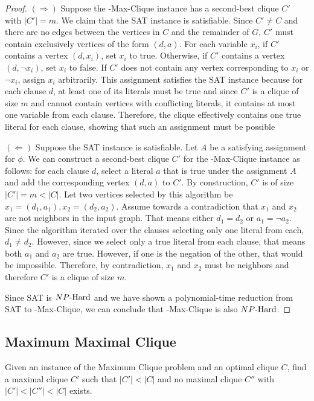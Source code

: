 \begin{proof}
$(\Rightarrow)$ Suppose the \exb{}-Max-Clique instance has a second-best clique $C'$ with $|C'| = m$. We claim that the SAT instance is satisfiable. Since $C' \neq C$ and there are no edges between the vertices in $C$ and the remainder of $G$, $C'$ must contain exclusively vertices of the form $(d, a)$. For each variable $x_i$, if $C'$ contains a vertex $(d, x_i)$, set $x_i$ to true. Otherwise, if $C'$ contains a vertex $(d, \neg x_i)$, set $x_i$ to false. If $C'$ does not contain any vertex corresponding to $x_i$ or $\neg x_i$, assign $x_i$ arbitrarily. This assignment satisfies the SAT instance because for each clause $d$, at least one of its literals must be true and since $C'$ is a clique of size $m$ and cannot contain vertices with conflicting literals, it contains at most one variable from each clause. Therefore, the clique effectively contains one true literal for each clause, showing that such an assignment must be possible

$(\Leftarrow)$ Suppose the SAT instance is satisfiable. Let $A$ be a satisfying assignment for $\phi$. We can construct a second-best clique $C'$ for the \exb{}-Max-Clique instance as follows: for each clause $d$, select a literal $a$ that is true under the assignment $A$ and add the corresponding vertex $(d, a)$ to $C'$. By construction, $C'$ is of size $|C'| = m < |C|$. Let two vertices selected by this algorithm be $x_1 = (d_1, a_1), x_2 = (d_2, a_2)$. Assume towards a contradiction that $x_1$ and $x_2$ are not neighbors in the input graph. That means either $d_1 = d_2$ or $a_1 = \neg a_2$. Since the algorithm iterated over the clauses selecting only one literal from each, $d_1 \neq d_2$. However, since we select only a true literal from each clause, that means both $a_1$ and $a_2$ are true. However, if one is the negation of the other, that would be impossible. Therefore, by contradiction, $x_1$ and $x_2$ must be neighbors and therefore $C'$ is a clique of size $m$.

Since SAT is ${NP\text{-Hard{}}}$ and we have shown a polynomial-time reduction from SAT to \exb{}-Max-Clique, we can conclude that \exb{}-Max-Clique is also ${NP\text{-Hard{}}}$.
\end{proof}

\subsection{Maximum Maximal Clique}
\begin{definition}
Given an instance of the Maximum Clique problem and an optimal clique $C$, find a maximal clique $C'$ such that $|C'| < |C|$ and no maximal clique $C''$ with $|C'| < |C''| < |C|$ exists.
\end{definition}

